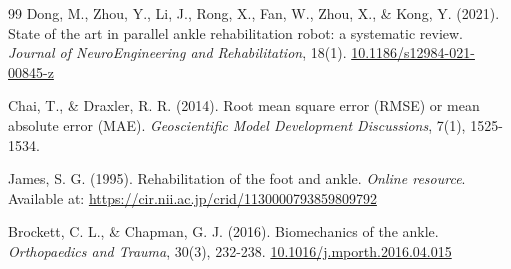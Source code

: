 \documentclass[letterpaper, 10 pt, conference]{ieeeconf}  %
\begin{document}
\begin{thebibliography}{99}
Dong, M., Zhou, Y., Li, J., Rong, X., Fan, W., Zhou, X., \& Kong, Y. (2021). State of the art in parallel ankle rehabilitation robot: a systematic review. \textit{Journal of NeuroEngineering and Rehabilitation}, 18(1). \url{10.1186/s12984-021-00845-z}

Chai, T., \& Draxler, R. R. (2014). Root mean square error (RMSE) or mean absolute error (MAE). \textit{Geoscientific Model Development Discussions}, 7(1), 1525-1534.

James, S. G. (1995). Rehabilitation of the foot and ankle. \textit{Online resource}. Available at: \url{https://cir.nii.ac.jp/crid/1130000793859809792}

Brockett, C. L., \& Chapman, G. J. (2016). Biomechanics of the ankle. \textit{Orthopaedics and Trauma}, 30(3), 232-238. \url{10.1016/j.mporth.2016.04.015}

\end{thebibliography}
\end{document}
